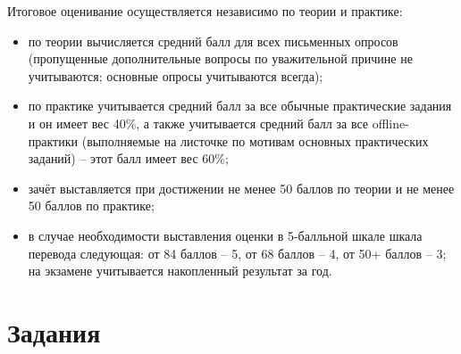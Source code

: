 \documentclass{article}
\begin{document}
Итоговое оценивание осуществляется независимо по теории и практике:

\begin{itemize}
\item по теории вычисляется средний балл для всех письменных опросов (пропущенные 
дополнительные вопросы по уважительной причине не учитываются; основные опросы 
учитываются всегда);
\item по практике учитывается средний балл за все обычные практические задания и он 
имеет вес 40\%, а также учитывается средний балл за все offline-практики (выполняемые
на листочке по мотивам основных практических заданий) -- этот балл имеет вес 60\%;
\item зачёт выставляется при достижении не менее 50 баллов по теории и не менее 50 баллов
по практике;
\item в случае необходимости выставления оценки в 5-балльной шкале шкала перевода 
следующая: от 84 баллов -- 5, от 68 баллов -- 4, от 50+ баллов -- 3; на экзамене 
учитывается накопленный результат за год.
\end{itemize}

\section{Задания}












\end{document}
